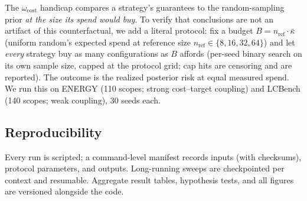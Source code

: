 The $\omega_{\mathrm{cost}}$ handicap compares a strategy's guarantees to
the random-sampling prior \emph{at the size its spend would buy}. To
verify that conclusions are not an artifact of this counterfactual, we
add a literal protocol: fix a budget $B = n_{\mathrm{ref}} \cdot
\bar{\kappa}$ (uniform random's expected spend at reference size
$n_{\mathrm{ref}} \in \{8,16,32,64\}$) and let \emph{every} strategy buy
as many configurations as $B$ affords (per-seed binary search on its own
sample size, capped at the protocol grid; cap hits are censoring and are
reported). The outcome is the realized posterior risk at equal measured
spend. We run this on ENERGY (110 scopes; strong cost--target coupling)
and LCBench (140 scopes; weak coupling), 30 seeds each.

\subsection{Reproducibility}

Every run is scripted; a command-level manifest records inputs (with
checksums), protocol parameters, and outputs. Long-running sweeps are
checkpointed per context and resumable. Aggregate result tables,
hypothesis tests, and all figures are versioned alongside the code.
